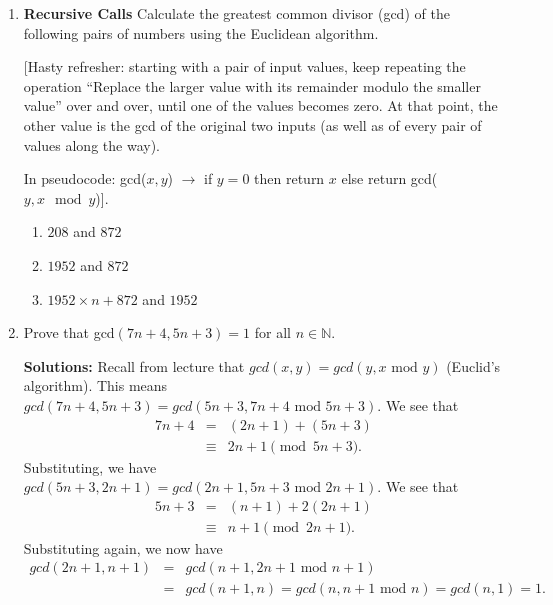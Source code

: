 \documentclass[11pt]{article}
\newif\ifsolutions
\begin{document}
\maketitle

\begin{enumerate}

\item {\bf Recursive Calls}  Calculate the greatest common divisor (gcd) of the following pairs of numbers using the Euclidean algorithm.

[Hasty refresher: starting with a pair of input values, keep repeating the operation ``Replace the larger value with its remainder modulo the smaller value'' over and over, until one of the values becomes zero. At that point, the other value is the gcd of the original two inputs (as well as of every pair of values along the way).

In pseudocode: gcd($x, y$) $\rightarrow$ if $y = 0$ then return $x$ else return gcd($y, x\mod y$)].

\begin{enumerate}
\item $208$ and $872$
\item $1952$ and $872$
\item $1952 \times n + 872$ and $1952$
\end{enumerate}

\ifsolutions
\textbf{Motivation for Problem:} This is supposed to be a quick refresher for the gcd algorithm, and attempts to show how gcd creates recursive calls of other gcd that we can use to shortcut.

\textbf{Solutions:} 8 for all of these. The first answer students should calculate by hand, the second answer will reduce to the first after one step, and the third answer will reduce to the second in one step.  \fi

\vspace{30mm}

\item Prove that gcd$(7n+4,5n+3)=1$ for all $n\in\mathbb{N}$.

\ifsolutions 
\textbf{Solutions:} Recall from lecture that $gcd(x, y) = gcd(y, x \text{ mod } y)$ (Euclid's algorithm). This means $gcd(7n+4,5n+3) = gcd(5n + 3, 7n + 4 \text{ mod } 5n + 3)$. We see that
\begin{eqnarray*}
7n + 4 &=&  (2n + 1) + (5n + 3)\\
&\equiv& 2n + 1 \pmod {5n + 3}.
\end{eqnarray*}
Substituting, we have $gcd(5n + 3, 2n + 1) = gcd(2n + 1, 5n + 3 \text{ mod } 2n + 1)$. We see that
\begin{eqnarray*}
5n + 3 &=& (n + 1) + 2(2n + 1)\\
&\equiv& n + 1 \pmod {2n + 1}.
\end{eqnarray*}
Substituting again, we now have 
\begin{eqnarray*}
gcd(2n + 1, n + 1) &=& gcd(n+ 1, 2n + 1 \text{ mod } n + 1) \\
&=& gcd(n + 1, n) = gcd(n, n + 1 \text{ mod } n) = gcd(n, 1) = 1.
\end{eqnarray*}


\end{enumerate}
\end{document}
